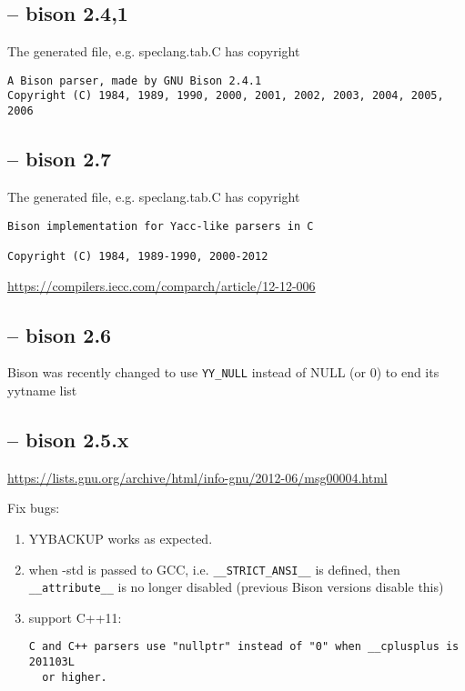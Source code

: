 \subsection{-- bison 2.4,1}
\label{sec:copyright-bison-2.4}

The generated file, e.g. speclang.tab.C has copyright
\begin{verbatim}
A Bison parser, made by GNU Bison 2.4.1
Copyright (C) 1984, 1989, 1990, 2000, 2001, 2002, 2003, 2004, 2005, 2006
\end{verbatim}

\subsection{-- bison 2.7}
\label{sec:copyright-bison-2.7}

The generated file, e.g. speclang.tab.C has copyright
\begin{verbatim}
Bison implementation for Yacc-like parsers in C

Copyright (C) 1984, 1989-1990, 2000-2012
\end{verbatim}

\url{https://compilers.iecc.com/comparch/article/12-12-006}

\subsection{-- bison 2.6}

Bison was recently changed
to use \verb!YY_NULL! instead of NULL (or 0) to end its yytname list


\subsection{-- bison 2.5.x}

\url{https://lists.gnu.org/archive/html/info-gnu/2012-06/msg00004.html}

Fix bugs:
\begin{enumerate}
  \item  YYBACKUP works as expected.
  
  \item when -std is passed to GCC, i.e. \verb!__STRICT_ANSI__! is defined, then 
  \verb!__attribute__! is no longer disabled (previous Bison versions disable this)
  
  
  \item support C++11: 
  
\begin{verbatim}
C and C++ parsers use "nullptr" instead of "0" when __cplusplus is 201103L
  or higher.
\end{verbatim}
\end{enumerate}

